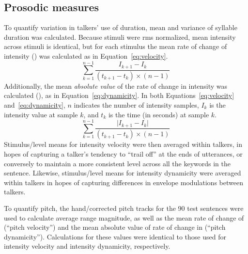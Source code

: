 \subsection{Prosodic measures}
To quantify variation in talkers’ use of duration, mean and variance of syllable duration was calculated.  %
Because stimuli were \ac{rms} normalized, mean intensity across stimuli is identical, but for each stimulus the mean rate of change of intensity () was calculated as in Equation~\ref{eq:velocity}.
%
\begin{equation}\label{eq:velocity}
	\sum_{k=1}^{n-1} \frac{I_{k+1} - I_k}{(t_{k+1} - t_k) \times (n-1)}
\end{equation}
%
Additionally, the mean \emph{absolute value} of the rate of change in intensity was calculated (), as in Equation~\ref{eq:dynamicity}.  In both Equations~\ref{eq:velocity} and~\ref{eq:dynamicity},  \(n\) indicates the number of intensity samples, \(I_k\) is the intensity value at sample \(k\), and \(t_k\) is the time (in seconds) at sample \(k\).  
%
\begin{equation}\label{eq:dynamicity}
	\sum_{k=1}^{n-1} \frac{\lvert I_{k+1} - I_k \rvert}{(t_{k+1} - t_k) \times (n-1)}
\end{equation}
%
Stimulus\-/level means for intensity velocity were then averaged within talkers, in hopes of capturing a talker’s tendency to “trail off” at the ends of utterances, or conversely to maintain a more consistent level across all the keywords in the sentence.  Likewise, stimulus\-/level means for intensity dynamicity were averaged within talkers in hopes of capturing differences in envelope modulations between talkers.

To quantify pitch, the hand\-/corrected pitch tracks for the 90 test sentences were used to calculate average \fo{} range magnitude, as well as the mean rate of change of \fo{} (“pitch velocity”) and the mean absolute value of rate of change in \fo{} (“pitch dynamicity”).  Calculations for these values were identical to those used for intensity velocity and intensity dynamicity, respectively.
